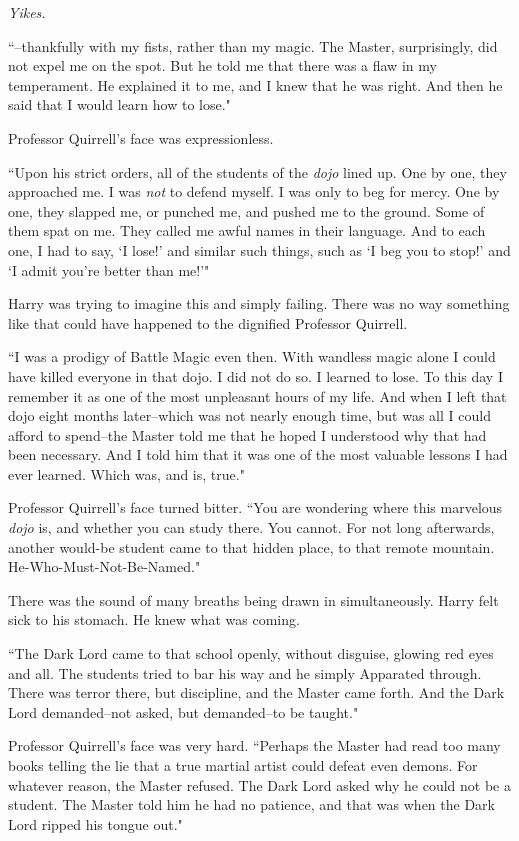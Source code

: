 \emph{Yikes.}

``\---thankfully with my fists, rather than my magic. The Master, surprisingly, did not expel me on the spot. But he told me that there was a flaw in my temperament. He explained it to me, and I knew that he was right. And then he said that I would learn how to lose."

Professor Quirrell's face was expressionless.

``Upon his strict orders, all of the students of the \emph{dojo} lined up. One by one, they approached me. I was \emph{not} to defend myself. I was only to beg for mercy. One by one, they slapped me, or punched me, and pushed me to the ground. Some of them spat on me. They called me awful names in their language. And to each one, I had to say, `I lose!' and similar such things, such as `I beg you to stop!' and `I admit you're better than me!'"

Harry was trying to imagine this and simply failing. There was no way something like that could have happened to the dignified Professor Quirrell.

``I was a prodigy of Battle Magic even then. With wandless magic alone I could have killed everyone in that dojo. I did not do so. I learned to lose. To this day I remember it as one of the most unpleasant hours of my life. And when I left that dojo eight months later\---which was not nearly enough time, but was all I could afford to spend\---the Master told me that he hoped I understood why that had been necessary. And I told him that it was one of the most valuable lessons I had ever learned. Which was, and is, true."

Professor Quirrell's face turned bitter. ``You are wondering where this marvelous \emph{dojo} is, and whether you can study there. You cannot. For not long afterwards, another would-be student came to that hidden place, to that remote mountain. He-Who-Must-Not-Be-Named."

There was the sound of many breaths being drawn in simultaneously. Harry felt sick to his stomach. He knew what was coming.

``The Dark Lord came to that school openly, without disguise, glowing red eyes and all. The students tried to bar his way and he simply Apparated through. There was terror there, but discipline, and the Master came forth. And the Dark Lord demanded\---not asked, but demanded\---to be taught."

Professor Quirrell's face was very hard. ``Perhaps the Master had read too many books telling the lie that a true martial artist could defeat even demons. For whatever reason, the Master refused. The Dark Lord asked why he could not be a student. The Master told him he had no patience, and that was when the Dark Lord ripped his tongue out."


